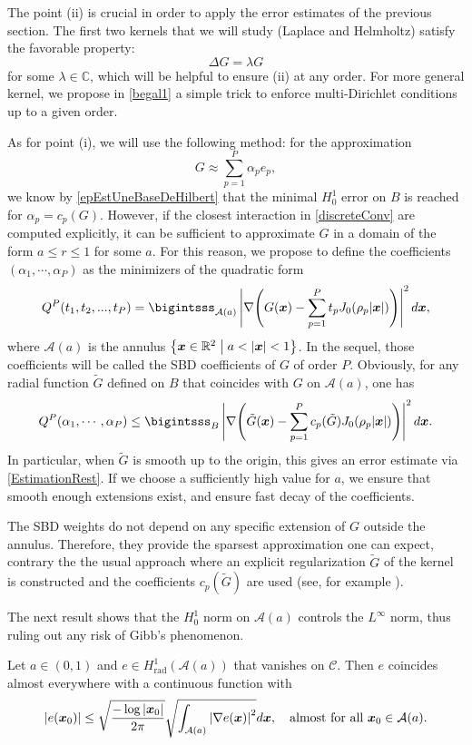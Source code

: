 \documentclass[smallextended]{svjour3}
\begin{document}
The point (ii) is crucial in order to apply the error estimates of the previous section. The first two kernels that we will study (Laplace and Helmholtz) satisfy the favorable property:
\[\Delta G = \lambda G\]
for some $\lambda \in \mathbb{C}$, which will be helpful to ensure (ii) at any order. For more general kernel, we propose in \autoref{begal1} a simple trick to enforce multi-Dirichlet conditions up to a given order. 

As for point (i), we will use the following method: for the approximation 
\[G \approx \sum_{p = 1}^P \alpha_p e_p,\]
we know by \autoref{epEstUneBaseDeHilbert} that the minimal $H^1_0$ error on $B$ is reached for $\alpha_p = c_p(G)$. However, if the closest interaction in \eqref{discreteConv} are computed explicitly, it can be sufficient to approximate $G$ in a domain of the form $a \leq r \leq 1$ for some $a$. For this reason, we propose to define the coefficients $(\alpha_1,\cdots,\alpha_P)$ as the minimizers of the quadratic form
\[ Q^P(t_1,t_2,...,t_P) = \bigintsss_{\mathcal{A}(a)} \left|\nabla \!\left( G(\bs{x}) - \sum_{p=1}^P t_p J_0(\rho_p |\bs{x}|)\right)\right|^2d\bs{x},\]
where $\mathcal{A}(a)$ is the annulus $\left\{\boldsymbol{x} \in \mathbb{R}^2\mathrel{}\middle|\mathrel{}a < \left\lvert \boldsymbol{x} \right\rvert < 1\right\}$. In the sequel, those coefficients will be called the SBD coefficients of $G$ of order $P$. Obviously, for any radial function $\tilde{G}$ defined on $B$ that coincides with $G$ on $\mathcal{A}(a)$, one has 
\[ Q^P(\alpha_1,\cdots,\alpha_P) \leq \bigintsss_{B} \left|\nabla \!\left( \tilde{G}(\bs{x}) - \sum_{p=1}^P c_p(\tilde{G}) J_0(\rho_p |\bs{x}|)\right)\right|^2d\bs{x}. \]
In particular, when $\tilde{G}$ is smooth up to the origin, this gives an error estimate via \autoref{EstimationRest}. If we choose a sufficiently high value for $a$, we ensure that smooth enough extensions exist, and ensure fast decay of the coefficients. 			
\begin{remark}
	\label{RemarkPotts}
	The SBD weights do not depend on any specific extension of $G$ outside the annulus. Therefore, they provide the sparsest approximation one can expect, contrary the the usual approach where an explicit regularization $\tilde{G}$ of the kernel is constructed and the coefficients $c_p(\tilde{G})$ are used (see, for example \cite{potts2004fast}). 
\end{remark}									
The next result shows that the $H_0^1$ norm on $\mathcal{A}(a)$ controls the $L^{\infty}$ norm, thus ruling out any risk of Gibb's phenomenon.
\begin{lemma}
	Let $a\in (0,1)$ and $e\in H^1_{\text{rad}}(\mathcal{A}(a))$ that vanishes on $\mathcal{C}$. 
	Then $e$ coincides almost everywhere with a continuous function with
	\[\left\lvert e(\boldsymbol{x}_0) \right\rvert \leq \sqrt{\dfrac{-\log \left\lvert \boldsymbol{x}_0 \right\rvert}{2\pi}}\sqrt{\int_{\mathcal{A}(a)} \left\lvert \nabla e(\boldsymbol{x}) \right\rvert^2} d\boldsymbol{x},\quad  \text{almost for all }\boldsymbol{x}_0 \in \mathcal{A}(a).\]
\end{lemma}
\end{document}
